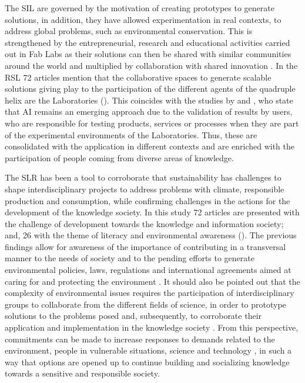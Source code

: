 \documentclass[english]{textolivre}
\begin{document}
The SIL are governed by the motivation of creating prototypes to generate solutions, in addition, they have allowed experimentation in real contexts, to address global problems, such as environmental conservation. This is strengthened by the entrepreneurial, research and educational activities carried out in Fab Labs as their solutions can then be shared with similar communities around the world and multiplied by collaboration with shared innovation \cite{wolf-powers2017}. In the RSL 72 articles mention that the collaborative spaces to generate scalable solutions giving play to the participation of the different agents of the quadruple helix are the Laboratories (). This coincides with the studies by \textcite{baran2020} and \textcite{barbancho2020}, who state that AI remains an emerging approach due to the validation of results by users, who are responsible for testing products, services or processes when they are part of the experimental environments of the Laboratories. Thus, these are consolidated with the application in different contexts and are enriched with the participation of people coming from diverse areas of knowledge. 

The SLR has been a tool to corroborate that sustainability has challenges to shape interdisciplinary projects to address problems with climate, responsible production and consumption, while confirming challenges in the actions for the development of the knowledge society. In this study 72 articles are presented with the challenge of development towards the knowledge and information society; and, 26 with the theme of literacy and environmental awareness (). The previous findings allow for awareness of the importance of contributing in a transversal manner to the needs of society and to the pending efforts to generate environmental policies, laws, regulations and international agreements aimed at caring for and protecting the environment \cite{estevez-alvarez2020}. It should also be pointed out that the complexity of environmental issues requires the participation of interdisciplinary groups to collaborate from the different fields of science, in order to prototype solutions to the problems posed and, subsequently, to corroborate their application and implementation in the knowledge society \cite{peduzzi2020}. From this perspective, commitments can be made to increase responses to demands related to the environment, people in vulnerable situations, science and technology \cite{mikhak2002}, in such a way that options are opened up to continue building and socializing knowledge towards a sensitive and responsible society.
\end{document}
